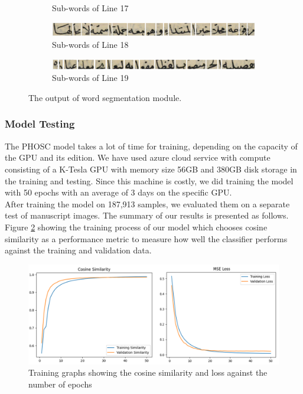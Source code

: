 \begin{figure}[H]
\begin{subfigure}[b]{0.3\textwidth}
         \caption{Sub-words of Line 17}
     \end{subfigure}
     \centering%
     \begin{subfigure}[b]{0.3\textwidth}
         \centering
         \includegraphics[width=\textwidth]{images/word-seg/line-18.png}
         \caption{Sub-words of Line 18}
     \end{subfigure}
     \centering%
     \begin{subfigure}[b]{0.3\textwidth}
         \centering
         \includegraphics[width=\textwidth]{images/word-seg/line-19.png}
         \caption{Sub-words of Line 19}
     \end{subfigure}
    \caption{The output of word segmentation module.}
    \label{fig:line-segmentation-results}
\end{figure}

\subsubsection{Model Testing}
The PHOSC model takes a lot of time for training, depending on the capacity of the GPU and its edition. We have used azure cloud service with compute consisting of a K-Tesla GPU with memory size 56GB and 380GB disk storage in the training and testing. Since this machine is costly, we did training the model with 50 epochs with an average of 3 days on the specific GPU. \\

After training the model on 187,913 samples, we evaluated them on a separate test of manuscript images. The summary of our results is presented as follows. Figure \ref{fig:training-graphs} showing the training process of our model which chooses cosine similarity as a performance metric to measure how well the classifier performs against the training and validation data.

\begin{figure}[H]
    \centering
    \includegraphics[width=14cm]{images/training-graphs.png}
    \caption{Training graphs showing the cosine similarity and loss against the number of epochs}
    \label{fig:training-graphs}
\end{figure}

